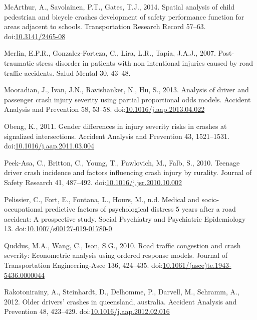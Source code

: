 \documentclass[]{elsarticle} %
\begin{document}
\leavevmode\hypertarget{ref-McArthur2014spatial}{}%
McArthur, A., Savolainen, P.T., Gates, T.J., 2014. Spatial analysis of
child pedestrian and bicycle crashes development of safety performance
function for areas adjacent to schools. Transportation Research Record
57--63. doi:\href{https://doi.org/10.3141/2465-08}{10.3141/2465-08}

\leavevmode\hypertarget{ref-Merlin2007stress}{}%
Merlin, E.P.R., Gonzalez-Forteza, C., Lira, L.R., Tapia, J.A.J., 2007.
Post-traumatic stress disorder in patients with non intentional injuries
caused by road traffic accidents. Salud Mental 30, 43--48.

\leavevmode\hypertarget{ref-Mooradian2013analysis}{}%
Mooradian, J., Ivan, J.N., Ravishanker, N., Hu, S., 2013. Analysis of
driver and passenger crash injury severity using partial proportional
odds models. Accident Analysis and Prevention 58, 53--58.
doi:\href{https://doi.org/10.1016/j.aap.2013.04.022}{10.1016/j.aap.2013.04.022}

\leavevmode\hypertarget{ref-Obeng2011gender}{}%
Obeng, K., 2011. Gender differences in injury severity risks in crashes
at signalized intersections. Accident Analysis and Prevention 43,
1521--1531.
doi:\href{https://doi.org/10.1016/j.aap.2011.03.004}{10.1016/j.aap.2011.03.004}

\leavevmode\hypertarget{ref-Peek-Asa2010teenage}{}%
Peek-Asa, C., Britton, C., Young, T., Pawlovich, M., Falb, S., 2010.
Teenage driver crash incidence and factors influencing crash injury by
rurality. Journal of Safety Research 41, 487--492.
doi:\href{https://doi.org/10.1016/j.jsr.2010.10.002}{10.1016/j.jsr.2010.10.002}

\leavevmode\hypertarget{ref-Pelissier2019medical}{}%
Pelissier, C., Fort, E., Fontana, L., Hours, M., n.d. Medical and
socio-occupational predictive factors of psychological distress 5 years
after a road accident: A prospective study. Social Psychiatry and
Psychiatric Epidemiology 13.
doi:\href{https://doi.org/10.1007/s00127-019-01780-0}{10.1007/s00127-019-01780-0}

\leavevmode\hypertarget{ref-Quddus2010road}{}%
Quddus, M.A., Wang, C., Ison, S.G., 2010. Road traffic congestion and
crash severity: Econometric analysis using ordered response models.
Journal of Transportation Engineering-Asce 136, 424--435.
doi:\href{https://doi.org/10.1061/(asce)te.1943-5436.0000044}{10.1061/(asce)te.1943-5436.0000044}

\leavevmode\hypertarget{ref-Rakotonirainy2012older}{}%
Rakotonirainy, A., Steinhardt, D., Delhomme, P., Darvell, M., Schramm,
A., 2012. Older drivers' crashes in queensland, australia. Accident
Analysis and Prevention 48, 423--429.
doi:\href{https://doi.org/10.1016/j.aap.2012.02.016}{10.1016/j.aap.2012.02.016}
\end{document}
